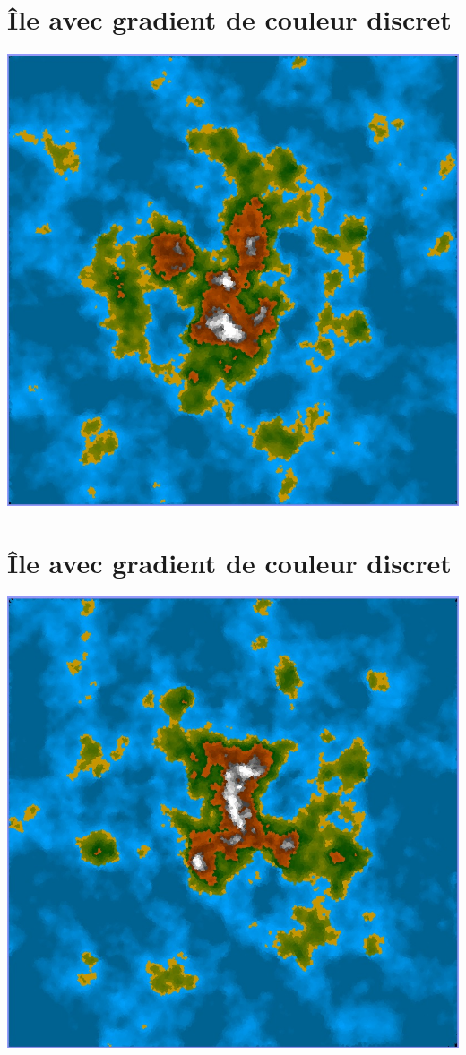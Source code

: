 \documentclass[a4paper, 10pt]{article}
\begin{document}
\begin{center}
\section*{Île avec gradient de couleur discret} 
\includegraphics[scale=0.4]{island.jpg}  
\bigbreak
\bigbreak
\section*{Île avec gradient de couleur discret} 
\includegraphics[scale=0.45]{RockyIsland.jpg} 
\bigbreak

\end{center}
\end{document}

